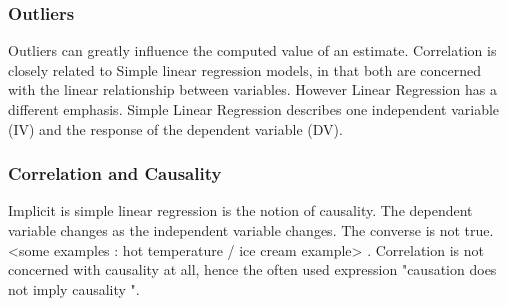 \documentclass[a4]{beamer}
\begin{document}
\begin{frame}
\frametitle{Outliers}
Outliers can greatly influence the computed value of an estimate.
Correlation is closely related to Simple linear regression models, in that both are concerned with the linear relationship between variables. However Linear Regression has a different emphasis.
Simple Linear Regression describes one independent variable (IV) and the response of the dependent variable (DV). 
\end{frame}


\begin{frame}
\frametitle{Correlation and Causality }
Implicit is simple linear regression is the notion of causality. The dependent variable changes as the independent variable changes. The converse is not true.
 <some examples : hot temperature / ice cream example> .
Correlation is not concerned with causality at all, hence the often used expression "causation does not imply causality ".

\end{frame}
\end{document}
